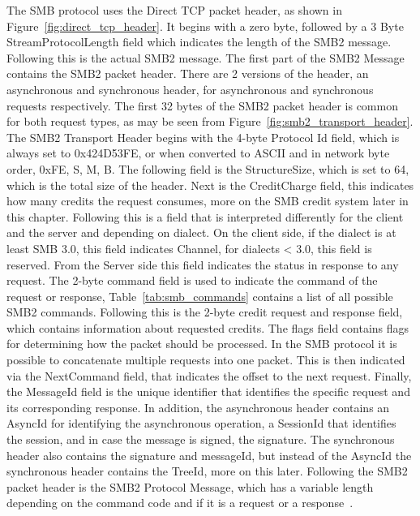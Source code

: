 \documentclass[english, 12pt, a4paper, elec, utf8, a-2b, online]{aaltothesis}
\begin{document}
The SMB protocol uses the Direct TCP packet header, as shown in Figure~\ref{fig:direct_tcp_header}.
It begins with a zero byte, followed by a 3 Byte StreamProtocolLength field which
indicates the length of the SMB2 message. Following this is the actual SMB2 message.
The first part of the SMB2 Message contains the SMB2 packet header. There are 2 versions
of the header, an asynchronous and synchronous header, for asynchronous and synchronous
requests respectively. The first 32 bytes of the SMB2 packet header is common for both
request types, as may be seen from Figure~\ref{fig:smb2_transport_header}. The SMB2 Transport
Header begins with the 4-byte Protocol Id field, which is always set to 0x424D53FE,
or when converted to ASCII and in network byte order, 0xFE, S, M, B. The following field
is the StructureSize, which is set to 64, which is the total size of the header. Next
is the CreditCharge field, this indicates how many credits the request consumes, more on
the SMB credit system later in this chapter. Following this is a field that is 
interpreted differently for the client and the server and depending on dialect.
On the client side, if the dialect is at least SMB 3.0, this field indicates Channel,
for dialects < 3.0, this field is reserved. From the Server side this field indicates
the status in response to any request. The 2-byte command field is used to 
indicate the command of the request or response, Table~\ref{tab:smb_commands} contains
a list of all possible SMB2 commands. Following this is the 2-byte credit request and
response field, which contains information about requested credits. The flags field
contains flags for determining how the packet should be processed. In the SMB
protocol it is possible to concatenate multiple requests into one packet. This is then
indicated via the NextCommand field, that indicates the offset to the next request.
Finally, the MessageId field is the unique identifier that identifies the specific
request and its corresponding response. In addition, the asynchronous header contains an AsyncId for identifying the asynchronous
operation, a SessionId that identifies the session, and in case the message is signed,
the signature. The synchronous header also contains the signature and messageId, but instead
of the AsyncId the synchronous header contains the TreeId, more on this later. Following
the SMB2 packet header is the SMB2 Protocol Message, which has a variable length depending
on the command code and if it is a request or a response~\cite{smb2_tech}.
\end{document}
